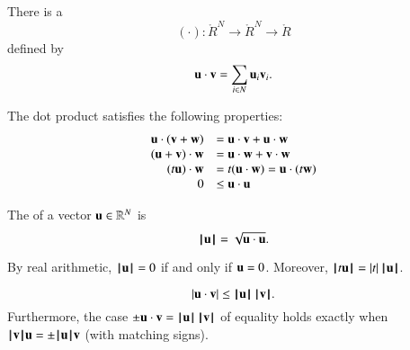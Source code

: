 \begin{definition}\label{def:dot}
There is a 
\begin{displaymath}(\cdot):\ring{R}^N\to\ring{R}^N\to\ring{R}\end{displaymath} defined by
    \begin{displaymath}\u\cdot \v = \sum_{i\in N} \u_i \v_i.\end{displaymath}
%
%
\end{definition}


The dot product satisfies the following
properties:
    \begin{equation}\label{eqn:dot}
    \begin{array}{rll}
        \u \cdot (\v + \w) &= \u \cdot \v + \u \cdot \w\\
        (\u + \v)\cdot \w &= \u \cdot \w + \v \cdot \w\\
        (t \u)\cdot \w &= t(\u \cdot \w) = \u \cdot (t \w)\\
        0 &\le \u\cdot \u\\
    \end{array}
    \end{equation}

\begin{definition}[norm]\label{def:norm}
The  of a vector $\u\in\ring{R}^N$ is
\begin{displaymath}\normo{\u} = \sqrt{\u\cdot \u}.\end{displaymath}
%
\end{definition}

By  real arithmetic,
$\normo{\u}=0$  if and only if $\u=0$.  Moreover,
$\normo{ t \u } = |t| \, \normo{\u}$.   



\begin{lemma}
    \begin{displaymath}|\u \cdot \v| \le \normo{\u}\,\normo{\v}.\end{displaymath}
Furthermore, the case
$\pm \u\cdot \v = \normo{\u}\,\normo{\v}$  of equality holds exactly when $\normo{\v} \u = \pm\normo{\u} \v$ (with matching signs).
\end{lemma}
%

